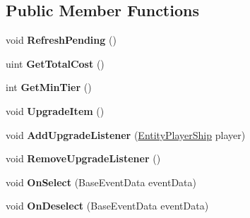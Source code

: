 \subsection*{Public Member Functions}
\begin{DoxyCompactItemize}
\item 
\hypertarget{class_skyrates_1_1_u_i_1_1_upgrade_button_a5a6ae2ddaf207f7c7bb73cd7526ccb85}{void {\bfseries Refresh\-Pending} ()}\label{class_skyrates_1_1_u_i_1_1_upgrade_button_a5a6ae2ddaf207f7c7bb73cd7526ccb85}

\item 
\hypertarget{class_skyrates_1_1_u_i_1_1_upgrade_button_a88a8f65b51969550ad2fce0641bcc17a}{uint {\bfseries Get\-Total\-Cost} ()}\label{class_skyrates_1_1_u_i_1_1_upgrade_button_a88a8f65b51969550ad2fce0641bcc17a}

\item 
\hypertarget{class_skyrates_1_1_u_i_1_1_upgrade_button_a16894888a275eae53b23cff84641ef70}{int {\bfseries Get\-Min\-Tier} ()}\label{class_skyrates_1_1_u_i_1_1_upgrade_button_a16894888a275eae53b23cff84641ef70}

\item 
\hypertarget{class_skyrates_1_1_u_i_1_1_upgrade_button_a52c7d9590f4a7555a5f787e71219273d}{void {\bfseries Upgrade\-Item} ()}\label{class_skyrates_1_1_u_i_1_1_upgrade_button_a52c7d9590f4a7555a5f787e71219273d}

\item 
\hypertarget{class_skyrates_1_1_u_i_1_1_upgrade_button_a8bf90d38357e700e36265464fae05254}{void {\bfseries Add\-Upgrade\-Listener} (\hyperlink{class_skyrates_1_1_entity_1_1_entity_player_ship}{Entity\-Player\-Ship} player)}\label{class_skyrates_1_1_u_i_1_1_upgrade_button_a8bf90d38357e700e36265464fae05254}

\item 
\hypertarget{class_skyrates_1_1_u_i_1_1_upgrade_button_ad6c7ddb799514c482fc6dd66d34c7801}{void {\bfseries Remove\-Upgrade\-Listener} ()}\label{class_skyrates_1_1_u_i_1_1_upgrade_button_ad6c7ddb799514c482fc6dd66d34c7801}

\item 
\hypertarget{class_skyrates_1_1_u_i_1_1_upgrade_button_aca7b54164381d7c9c8a9bfa2e155ff24}{void {\bfseries On\-Select} (Base\-Event\-Data event\-Data)}\label{class_skyrates_1_1_u_i_1_1_upgrade_button_aca7b54164381d7c9c8a9bfa2e155ff24}

\item 
\hypertarget{class_skyrates_1_1_u_i_1_1_upgrade_button_a7eaa631d9f99b4982585ad420a4ec682}{void {\bfseries On\-Deselect} (Base\-Event\-Data event\-Data)}\label{class_skyrates_1_1_u_i_1_1_upgrade_button_a7eaa631d9f99b4982585ad420a4ec682}

\end{DoxyCompactItemize}
